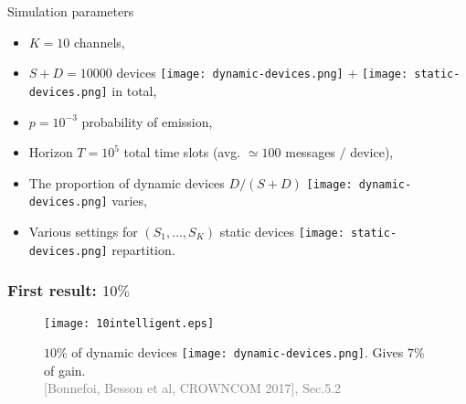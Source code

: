 \begin{frameO}

    \begin{colorblock}{Simulation parameters}

        \begin{itemize}
            \setlength\itemsep{10pt}
            \item
                  \(K = 10\) channels,
            \item
                  \(S + D = 10000\) devices \texttt{[image: dynamic-devices.png]} + \texttt{[image: static-devices.png]} in total,
            \item
                  \(p = 10^{-3}\) probability of emission,
            \item
                  Horizon \(T = 10^5\) total time slots (avg. \(\simeq 100\) messages \(/\)
                  device),
            \item
                  The proportion of dynamic devices \(D/(S+D)\) \texttt{[image: dynamic-devices.png]} varies,
            \item
                  Various settings for \((S_1,\dots,S_{K})\) static devices \texttt{[image: static-devices.png]} repartition.
        \end{itemize}

    \end{colorblock}

\end{frameO}



\subsubsection{First result: $10\%$}

\begin{frameO}

    \begin{figure}[h!]
        \centering
        \texttt{[image: 10intelligent.eps]}

            $10\%$ of dynamic devices \texttt{[image: dynamic-devices.png]}. Gives $7\%$ of gain.\\
            {\tiny \textcolor{gray}{[Bonnefoi, Besson et al, CROWNCOM 2017], Sec.5.2}}
    \end{figure}

\end{frameO}



